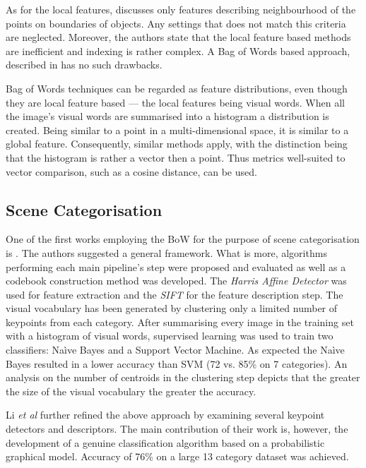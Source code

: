 \documentclass[a4paper,12pt]{article}
\begin{document}
  As for the local features, \cite{toldo2009bag} discusses only features describing neighbourhood of the points on boundaries of objects. Any settings that does not match this criteria are neglected. Moreover, the authors state that the local feature based methods are inefficient and indexing is rather complex. A Bag of Words based approach, described in \cite{li2010investigating} has no such drawbacks.
   
	Bag of Words techniques can be regarded as feature distributions, even though they are local feature based --- the local features being visual words. When all the image's visual words are summarised into a histogram a distribution is created. Being similar to a point in a multi-dimensional space, it is similar to a global feature. Consequently, similar methods apply, with the distinction being that the histogram is rather a vector then a point. Thus metrics well-suited to vector comparison, such as a cosine distance, can be used.
  
  \subsection{Scene Categorisation}
  
  One of the first works employing the BoW for the purpose of scene categorisation is \cite{csurka2004visual}. The authors suggested a general framework. What is more, algorithms performing each main pipeline's step were proposed and evaluated as well as a codebook construction method was developed. The \emph{Harris Affine Detector} was used for feature extraction and the \emph{SIFT} for the feature description step. The visual vocabulary has been generated by clustering only a limited number of keypoints from each category. After summarising every image in the training set with a histogram of visual words, supervised learning was used to train two classifiers: Na\`ive Bayes and a Support Vector Machine. As expected the Na\`ive Bayes resulted in a lower accuracy than SVM (72 vs. 85\% on 7 categories). An analysis on the number of centroids in the clustering step depicts that the greater the size of the visual vocabulary the greater the accuracy. 
  
  Li \emph{et al} further refined the above approach by examining several keypoint detectors and descriptors. The main contribution of their work is, however, the development of a genuine classification algorithm based on a probabilistic graphical model. Accuracy of 76\% on a large 13 category dataset was achieved.
  
\end{document}

